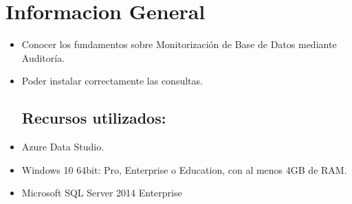 \section{Informacion General} 

\begin{itemize}
\subsection{Objetivos:}
	\item Conocer los fundamentos sobre Monitorización de Base de Datos mediante Auditoría.
	\item Poder instalar correctamente  las consultas.
\subsection{ Recursos utilizados:}
	\item Azure Data Studio.
	\item Windows 10 64bit: Pro, Enterprise o Education, con al menos 4GB de RAM.
	\item Microsoft SQL Server 2014 Enterprise

\end{itemize}
